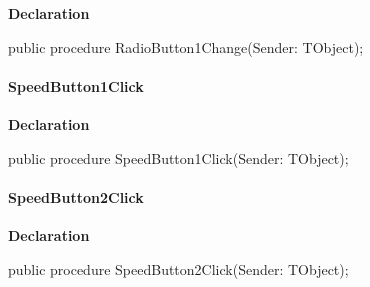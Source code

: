 \documentclass{report}
\newif\ifpdf
\begin{document}
\label{prjwizard.TfrmProjectWizard-RadioButton1Change}
\begin{list}{}{
\setlength{\itemindent}{0cm}
\setlength{\listparindent}{0cm}
\setlength{\leftmargin}{\evensidemargin}
\addtolength{\leftmargin}{\tmplength}
\settowidth{\labelsep}{X}
\addtolength{\leftmargin}{\labelsep}
\setlength{\labelwidth}{\tmplength}
}
\item[\textbf{Declaration}\hfill]
\ifpdf
\begin{flushleft}
\fi
\begin{ttfamily}
public procedure RadioButton1Change(Sender: TObject);\end{ttfamily}

\ifpdf
\end{flushleft}
\fi

\end{list}
\paragraph*{SpeedButton1Click}\hspace*{\fill}

\label{prjwizard.TfrmProjectWizard-SpeedButton1Click}
\begin{list}{}{
\setlength{\itemindent}{0cm}
\setlength{\listparindent}{0cm}
\setlength{\leftmargin}{\evensidemargin}
\addtolength{\leftmargin}{\tmplength}
\settowidth{\labelsep}{X}
\addtolength{\leftmargin}{\labelsep}
\setlength{\labelwidth}{\tmplength}
}
\item[\textbf{Declaration}\hfill]
\ifpdf
\begin{flushleft}
\fi
\begin{ttfamily}
public procedure SpeedButton1Click(Sender: TObject);\end{ttfamily}

\ifpdf
\end{flushleft}
\fi

\end{list}
\paragraph*{SpeedButton2Click}\hspace*{\fill}

\label{prjwizard.TfrmProjectWizard-SpeedButton2Click}
\begin{list}{}{
\setlength{\itemindent}{0cm}
\setlength{\listparindent}{0cm}
\setlength{\leftmargin}{\evensidemargin}
\addtolength{\leftmargin}{\tmplength}
\settowidth{\labelsep}{X}
\addtolength{\leftmargin}{\labelsep}
\setlength{\labelwidth}{\tmplength}
}
\item[\textbf{Declaration}\hfill]
\ifpdf
\begin{flushleft}
\fi
\begin{ttfamily}
public procedure SpeedButton2Click(Sender: TObject);\end{ttfamily}

\ifpdf
\end{flushleft}
\fi

\end{list}
\end{document}
